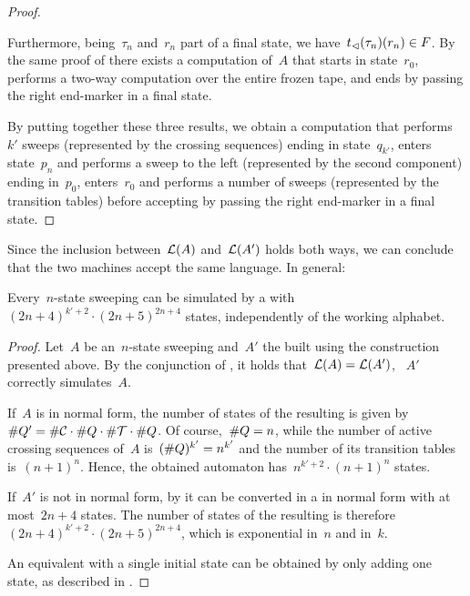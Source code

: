 \begin{proof}
\begin{enumerate}
		      Furthermore, being~$\tau_n$ and~$r_n$ part of a final state, we have~$t_\lhd(\tau_n)(r_n)\in F$.
		      By the same proof of  there exists a computation of~$A$ that starts in state~$r_0$, performs a two-way computation over the entire frozen tape, and ends by passing the right end-marker in a final state.
	\end{enumerate}
	By putting together these three results, we obtain a computation that performs~$k'$ sweeps (represented by the crossing sequences) ending in state~$q_{k'}$, enters state~$p_n$ and performs a sweep to the left (represented by the second component) ending in~$p_0$, enters~$r_0$ and performs a number of sweeps (represented by the transition tables) before accepting by passing the right end-marker in a final state.
\end{proof}

Since the inclusion between~$\mathcal L(A)$ and~$\mathcal L(A')$ holds both ways, we can conclude that the two machines accept the same language.
In general:
\begin{thrm}\label{thm:swkLAtoNFA}
	Every~$n$-state sweeping \kDLA can be simulated by a \ONFA with~$(2n+4)^{k'+2}\cdot(2n+5)^{2n+4}$ states, independently of the working alphabet.
\end{thrm}
\begin{proof}
	Let~$A$ be an~$n$-state sweeping \kDLA and~$A'$ the \ONFA built using the construction presented above.
	By the conjunction of , it holds that~$\mathcal L(A)=\mathcal L(A')$, \ie~$A'$ correctly simulates~$A$.

	If~$A$ is in normal form, the number of states of the resulting \ONFA is given by~$\# Q'=\# \mathcal C\cdot\# Q\cdot\# \mathcal T\cdot\# Q$.
	Of course,~$\# Q=n$, while the number of active crossing sequences of~$A$ is~$(\# Q)^{k'}=n^{k'}$ and the number of its transition tables is~$(n+1)^n$.
	Hence, the obtained automaton has~$n^{k'+2}\cdot(n+1)^n$ states.

	If~$A'$ is not in normal form, by  it can be converted in a \kDLA in normal form with at most~$2n+4$ states.
	The number of states of the resulting \ONFA is therefore~$(2n+4)^{k'+2}\cdot(2n+5)^{2n+4}$, which is exponential in~$n$ and in~$k$.

	An equivalent \ONFA with a single initial state can be obtained by only adding one state, as described in .
\end{proof}

